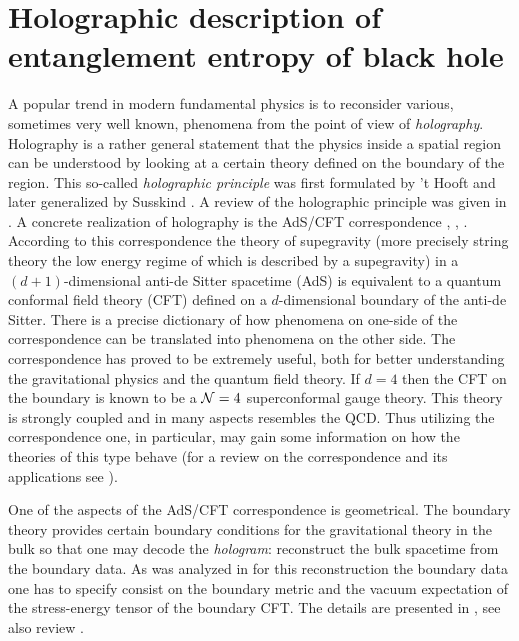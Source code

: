 \documentclass[12pt]{article}
\begin{document}
\section{Holographic description of entanglement entropy of black hole}
\label{section: Holographic description}

A popular trend in  modern fundamental physics is to reconsider various, sometimes very well known, phenomena from the point of view of
 {\it holography}. Holography is a rather general statement  that the physics inside a spatial region can be  understood by looking at a
certain theory defined on the boundary of the region. This  so-called {\it holographic principle} was first formulated by 't Hooft \cite{'tHooft:1993gx} and later generalized by Susskind  \cite{Susskind:1994vu}.
A review of the holographic principle was given in  \cite{Bousso:2002ju}.  A concrete realization of  holography is the AdS/CFT correspondence  \cite{Maldacena:1997re}, \cite{Witten:1998qj},
\cite{Gubser:1998bc}. According to this correspondence the theory of supegravity
(more precisely string theory the low energy regime of which is described by a supegravity) in a $(d+1)$-dimensional anti-de Sitter spacetime (AdS) is equivalent to a quantum conformal field theory (CFT) defined on a $d$-dimensional boundary of the anti-de Sitter. There is a precise dictionary of how phenomena on one-side of the correspondence can be translated into
phenomena on the other side. The correspondence has proved to be extremely useful, both for better understanding the gravitational physics and the quantum field theory.
If $d=4$ then the CFT on the boundary is known to be  a ${\cal N}=4$ superconformal gauge theory. This theory is strongly coupled and in many aspects resembles the QCD.
Thus utilizing the correspondence one, in particular,  may gain some information on how the theories of this type behave (for a review on the correspondence  and its applications see \cite{Aharony:1999ti}).

One of the aspects of the AdS/CFT correspondence is geometrical. The boundary theory provides  certain boundary conditions for the gravitational theory in the bulk so that
one may decode the {\it hologram}: reconstruct the bulk spacetime from the boundary data. As was analyzed  in  \cite{deHaro:2000xn}   for this reconstruction the boundary data one has to specify consist on the boundary metric and the vacuum expectation of the stress-energy tensor of the boundary CFT.  The details are presented in \cite{deHaro:2000xn}, see also review  \cite{Skenderis:2000in}.
\end{document}
